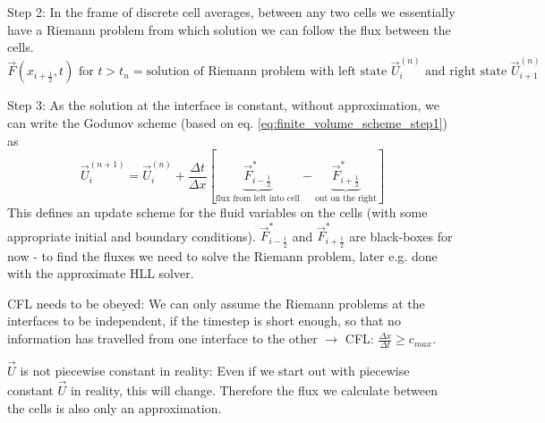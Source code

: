 \textcolor{blue1}{Step 2}: In the frame of discrete cell averages, \textcolor{blue1}{between any two cells we essentially have a Riemann problem from which solution we can follow the flux between the cells}.
\begin{equation}
    \vec{F}(x_{i+\frac{1}{2}},t) \text{ for } t > t_n = \text{solution of Riemann problem with left state } \vec{U}_i^{(n)} \text{ and right state } \vec{U}_{i+1}^{(n)}
\end{equation}
\begin{mdframed}[style=padded]
    \textcolor{blue1}{Step 3}: As the solution at the interface is constant, without approximation, we can write the \textcolor{blue1}{Godunov scheme} (based on eq. \ref{eq:finite_volume_scheme_step1}) as
    \begin{equation}
        \vec{U}_i^{(n+1)}=\vec{U}_i^{(n)}+\frac{\Delta t}{\Delta x}\left[\underbrace{\vec{F}^*_{i-\frac{1}{2}}}_{\text{flux from left into cell}}-\underbrace{\vec{F}^*_{i+\frac{1}{2}}}_{\text{out on the right}}\right]
    \end{equation}
    This defines an update scheme for the fluid variables on the cells (with some appropriate initial and boundary conditions). $\vec{F}^*_{i-\frac{1}{2}}$ and $\vec{F}^*_{i+\frac{1}{2}}$ are black-boxes for now - to find the fluxes we need to solve the Riemann problem, later e.g. done with the approximate HLL solver.
\end{mdframed}

\textcolor{red1}{CFL needs to be obeyed:} We can only assume the Riemann problems at the interfaces to be independent, if the timestep is short enough, so that no information has travelled from one interface to the other $\rightarrow$ CFL: $\frac{\Delta x}{\Delta t} \geq c_{max}$.

\textcolor{red1}{$\vec{U}$ is not piecewise constant in reality:} Even if we start out with piecewise constant $\vec{U}$ in reality, this will change. Therefore the flux we calculate between the cells is also only an approximation.


